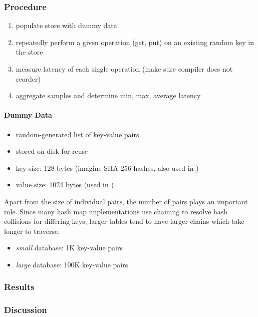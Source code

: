 \subsubsection{Procedure}


\begin{enumerate}
    \item populate store with dummy data
    \item repeatedly perform a given operation (get, put) on an existing random key in the store
    \item measure latency of each single operation (make sure compiler does not reorder)
    \item aggregate samples and determine min, max, average latency
\end{enumerate}

\paragraph{Dummy Data}

\begin{itemize}
    \item random-generated list of key-value pairs
    \item stored on disk for reuse
    \item key size: 128 bytes (imagine SHA-256 hashes, also used in \cite{bailey2013exploring})
    \item value size: 1024 bytes (used in \cite{bailey2013exploring})
\end{itemize}

Apart from the size of individual pairs, the number of pairs plays an important
role. Since many hash map implementations use chaining to resolve hash
collisions for  differing keys, larger tables tend to have larger chains which
take longer to traverse.

\begin{itemize}
    \item \emph{small} database: 1K key-value pairs
    \item \emph{large} database: 100K key-value pairs
\end{itemize}

\subsubsection{Results}


\subsubsection{Discussion}

